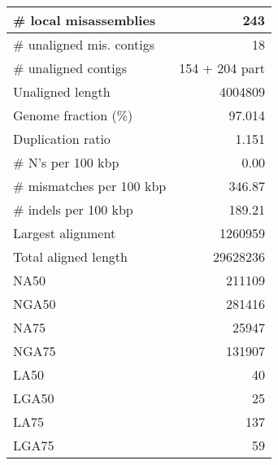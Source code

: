 \documentclass[12pt,a4paper]{article}
\begin{document}
\begin{table}[ht]
\begin{center}
\begin{tabular}{|l*{1}{|r}|}
\# local misassemblies & 243 \\ \hline
\# unaligned mis. contigs & 18 \\ \hline
\# unaligned contigs & 154 + 204 part \\ \hline
Unaligned length & 4004809 \\ \hline
Genome fraction (\%) & 97.014 \\ \hline
Duplication ratio & 1.151 \\ \hline
\# N's per 100 kbp & 0.00 \\ \hline
\# mismatches per 100 kbp & 346.87 \\ \hline
\# indels per 100 kbp & 189.21 \\ \hline
Largest alignment & 1260959 \\ \hline
Total aligned length & 29628236 \\ \hline
NA50 & 211109 \\ \hline
NGA50 & 281416 \\ \hline
NA75 & 25947 \\ \hline
NGA75 & 131907 \\ \hline
LA50 & 40 \\ \hline
LGA50 & 25 \\ \hline
LA75 & 137 \\ \hline
LGA75 & 59 \\ \hline
\end{tabular}
\end{center}
\end{table}
\end{document}
